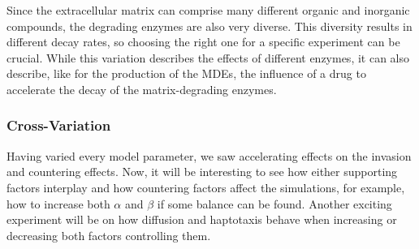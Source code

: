 Since the extracellular matrix can comprise many different organic and inorganic compounds, the degrading enzymes are also very diverse. This diversity results in different decay rates, so choosing the right one for a specific experiment can be crucial. While this variation describes the effects of different enzymes, it can also describe, like for the production of the MDEs, the influence of a drug to accelerate the decay of the matrix-degrading enzymes.

\subsubsection*{Cross-Variation}
Having varied every model parameter, we saw accelerating effects on the invasion and countering effects. Now, it will be interesting to see how either supporting factors interplay and how countering factors affect the simulations, for example, how to increase both $\alpha$ and $\beta$ if some balance can be found. Another exciting experiment will be on how diffusion and haptotaxis behave when increasing or decreasing both factors controlling them.

